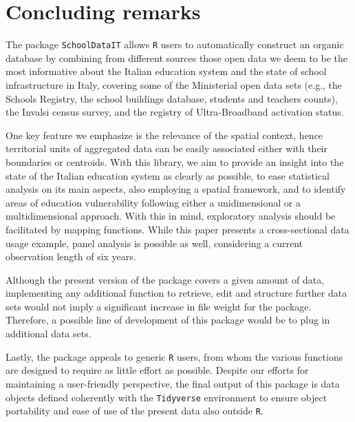 \documentclass{article}%
\begin{document}
\section{Concluding remarks}
The package \texttt{SchoolDataIT} allows \texttt{R} users to automatically construct an organic database by combining from different sources those open data we deem to be the most informative about the Italian education system and the state of school infrastructure in Italy, covering some of the Ministerial open data sets (e.g., the Schools Registry, the school buildings database, students and teachers counts), the Invalsi census survey, and the registry of Ultra-Broadband activation status. 

One key feature we emphasize is the relevance of the spatial context, hence territorial units of aggregated data can be easily associated either with their boundaries or centroids. With this library, we aim to provide an insight into the state of the Italian education system as clearly as possible, to ease statistical analysis on its main aspects, also employing a spatial framework, and to identify areas of education vulnerability following either a unidimensional or a multidimensional approach. With this in mind, exploratory analysis should be facilitated by mapping functions. While this paper presents a cross-sectional data usage example, panel analysis is possible as well, considering a current observation length of six years. 

Although the present version of the package covers a given amount of data, implementing any additional function to retrieve, edit and structure further data sets would not imply a significant increase in file weight for the package. Therefore, a possible line of development of this package would be to plug in additional data sets.

Lastly, the package appeals to generic \texttt{R} users, from whom the various functions are designed to require as little effort as possible. Despite our efforts for maintaining a user-friendly perspective, the final output of this package is data objects defined coherently with the \texttt{Tidyverse} environment to ensure object portability and ease of use of the present data also outside \texttt{R}.



%


%
%
%
%
\end{document}
